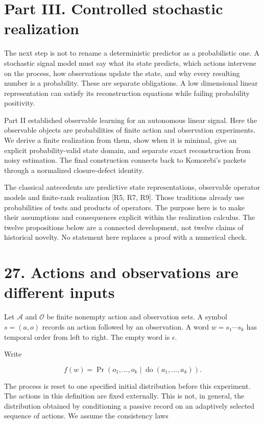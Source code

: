 \documentclass[11pt,letterpaper]{article}
\begin{document}
\newpage

\section{Part III. Controlled stochastic
realization}\label{part-iii.-controlled-stochastic-realization}

The next step is not to rename a deterministic predictor as a
probabilistic one. A stochastic signal model must say what its state
predicts, which actions intervene on the process, how observations
update the state, and why every resulting number is a probability. These
are separate obligations. A low dimensional linear representation can
satisfy its reconstruction equations while failing probability
positivity.

Part II established observable learning for an autonomous linear signal.
Here the observable objects are probabilities of finite action and
observation experiments. We derive a finite realization from them, show
when it is minimal, give an explicit probability-valid state domain, and
separate exact reconstruction from noisy estimation. The final
construction connects back to Komorebi's packets through a normalized
closure-defect identity.

The classical antecedents are predictive state representations,
observable operator models and finite-rank realization {[}R5, R7, R9{]}.
Those traditions already use probabilities of tests and products of
operators. The purpose here is to make their assumptions and
consequences explicit within the realization calculus. The twelve
propositions below are a connected development, not twelve claims of
historical novelty. No statement here replaces a proof with a numerical
check.

\section{27. Actions and observations are different
inputs}\label{actions-and-observations-are-different-inputs}

Let \(\mathcal A\) and \(\mathcal O\) be finite nonempty action and
observation sets. A symbol \(s=(a,o)\) records an action followed by an
observation. A word \(w=s_1\cdots s_k\) has temporal order from left to
right. The empty word is \(\epsilon\).

Write

\[
f(w)=\Pr(o_1,\ldots,o_k\mid \operatorname{do}(a_1,\ldots,a_k)).
\]

The process is reset to one specified initial distribution before this
experiment. The actions in this definition are fixed externally. This is
not, in general, the distribution obtained by conditioning a passive
record on an adaptively selected sequence of actions. We assume the
consistency laws
\end{document}

